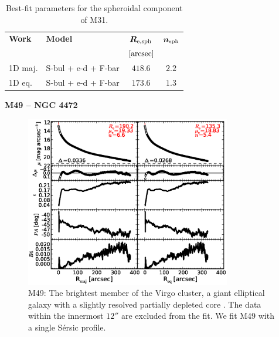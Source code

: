 \documentclass[preprint2]{emulateapj}
\newcommand{\fitfigurewidth}{0.8\textwidth}
\begin{document}
  \begin{table}[h]
  \small
  \caption{Best-fit parameters for the spheroidal component of M31.}
  \begin{center}
  \begin{tabular}{llcc}
  \hline
  {\bf Work} & {\bf Model}   & $\bm R_{\rm e,sph}$    & $\bm n_{\rm sph}$ \\
    &  &  $[\rm arcsec]$ & \\
  \hline
  1D maj. & S-bul + e-d + F-bar & $418.6$  &  $2.2$ \\
  1D eq.  & S-bul + e-d + F-bar & $173.6$  &  $1.3$ \\
  \hline
  \end{tabular}
  \end{center}
  \label{tab:m31}
  \end{table}

  \clearpage\newpage\noindent
  {\bf M49 -- NGC 4472 \\}
  
  \begin{figure}[h]
  \begin{center}
  \includegraphics[width=\fitfigurewidth]{images/m49_1Dfit.eps}
  \caption{M49:
  The brightest member of the Virgo cluster, a giant elliptical galaxy 
  with a slightly resolved partially depleted core \citep{rusli2013}.  %
  The data within the innermost $12''$ are excluded from the fit.
  We fit M49 with a single S\'ersic profile. 
  }
  \end{center}
  \end{figure}
\end{document}
